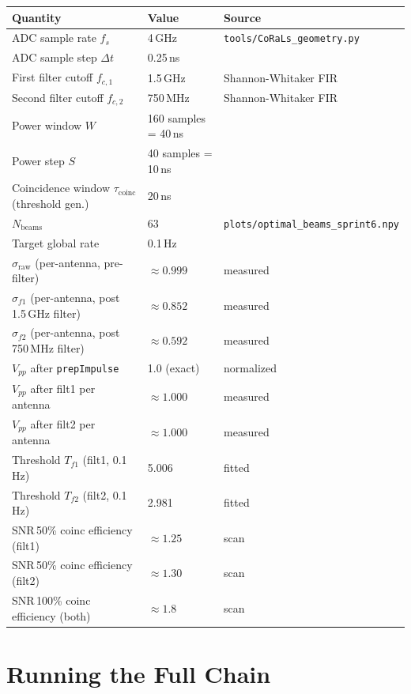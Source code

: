 \documentclass[11pt,letterpaper]{article}
\begin{document}
\begin{center}
\begin{tabular}{lll}
\toprule
Quantity & Value & Source \\
\midrule
ADC sample rate $f_s$ & 4\,GHz & \texttt{tools/CoRaLs\_geometry.py} \\
ADC sample step $\Delta t$ & 0.25\,ns & \\
First filter cutoff $f_{c,1}$ & 1.5\,GHz & Shannon-Whitaker FIR \\
Second filter cutoff $f_{c,2}$ & 750\,MHz & Shannon-Whitaker FIR \\
Power window $W$ & 160 samples = 40\,ns & \\
Power step $S$   & 40 samples = 10\,ns  & \\
Coincidence window $\tau_\mathrm{coinc}$ (threshold gen.) & 20\,ns & \\
$N_\mathrm{beams}$ & 63 & \texttt{plots/optimal\_beams\_sprint6.npy} \\
Target global rate & 0.1\,Hz & \\
\midrule
$\sigma_\mathrm{raw}$ (per-antenna, pre-filter) & $\approx 0.999$ & measured \\
$\sigma_{f1}$ (per-antenna, post 1.5\,GHz filter) & $\approx 0.852$ & measured \\
$\sigma_{f2}$ (per-antenna, post 750\,MHz filter)  & $\approx 0.592$ & measured \\
$V_{pp}$ after \texttt{prepImpulse} & 1.0 (exact) & normalized \\
$V_{pp}$ after filt1 per antenna & $\approx 1.000$ & measured \\
$V_{pp}$ after filt2 per antenna & $\approx 1.000$ & measured \\
\midrule
Threshold $T_{f1}$ (filt1, 0.1\,Hz) & 5.006 & fitted \\
Threshold $T_{f2}$ (filt2, 0.1\,Hz) & 2.981 & fitted \\
\midrule
SNR\,50\% coinc efficiency (filt1) & $\approx 1.25$ & scan \\
SNR\,50\% coinc efficiency (filt2) & $\approx 1.30$ & scan \\
SNR\,100\% coinc efficiency (both) & $\approx 1.8$ & scan \\
\bottomrule
\end{tabular}
\end{center}

\section{Running the Full Chain}
\end{document}
